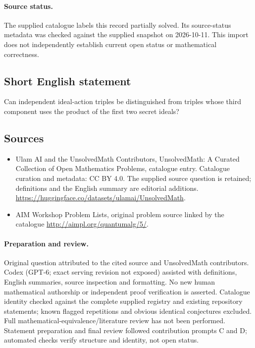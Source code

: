 \documentclass[11pt]{article}
\begin{document}
\paragraph{Source status.}
The supplied catalogue labels this record partially solved. Its source-status metadata was checked against the supplied snapshot on 2026-10-11. This import does not independently establish current open status or mathematical correctness.
\subsection{Short English statement}
Can independent ideal-action triples be distinguished from triples whose third component uses the product of the first two secret ideals?
\subsection{Sources}
\begin{itemize}
\item[S1] Ulam AI and the UnsolvedMath Contributors, UnsolvedMath: A Curated Collection of Open Mathematics Problems, catalogue entry. Catalogue curation and metadata: CC BY 4.0. The supplied source question is retained; definitions and the English summary are editorial additions.
\url{https://huggingface.co/datasets/ulamai/UnsolvedMath}.
\item[S2] AIM Workshop Problem Lists, original problem source linked by the catalogue
\url{http://aimpl.org/quantumalg/5/}.
\end{itemize}
\paragraph{Preparation and review.}
Original question attributed to the cited source and UnsolvedMath contributors. Codex (GPT-6; exact serving revision not exposed) assisted with definitions, English summaries, source inspection and formatting. No new human mathematical authorship or independent proof verification is asserted. Catalogue identity checked against the complete supplied registry and existing repository statements; known flagged repetitions and obvious identical conjectures excluded. Full mathematical-equivalence/literature review has not been performed. Statement preparation and final review followed contribution prompts C and D; automated checks verify structure and identity, not open status.
\label{end:statement}
\end{document}
